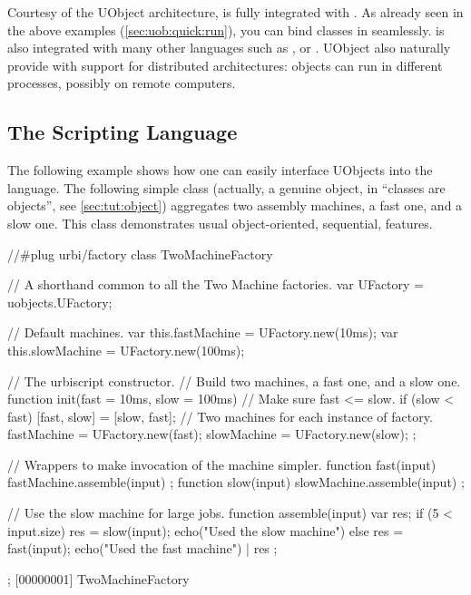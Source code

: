 Courtesy of the UObject architecture, \us is fully integrated with
\Cxx. As already seen in the above examples
(\autoref{sec:uob:quick:run}), you can bind \Cxx classes in \us
seamlessly. \us is also integrated with many other languages such as
\java, \matlab or \python.  UObject also naturally provide \us with
support for distributed architectures: objects can run in different
processes, possibly on remote computers.

\subsection{The \us Scripting Language}

The following example shows how one can easily interface UObjects into
the \us language.  The following simple class (actually, a genuine
object, in \us ``classes are objects'', see \autoref{sec:tut:object})
aggregates two assembly machines, a fast one, and a slow one.  This
class demonstrates usual object-oriented, sequential, features.

\begin{urbiscript}[firstnumber=1]
//#plug urbi/factory
class TwoMachineFactory
{
  // A shorthand common to all the Two Machine factories.
  var UFactory = uobjects.UFactory;

  // Default machines.
  var this.fastMachine = UFactory.new(10ms);
  var this.slowMachine = UFactory.new(100ms);

  // The urbiscript constructor.
  // Build two machines, a fast one, and a slow one.
  function init(fast = 10ms, slow = 100ms)
  {
    // Make sure fast <= slow.
    if (slow < fast)
      [fast, slow] = [slow, fast];
    // Two machines for each instance of factory.
    fastMachine = UFactory.new(fast);
    slowMachine = UFactory.new(slow);
  };

  // Wrappers to make invocation of the machine simpler.
  function fast(input) { fastMachine.assemble(input) };
  function slow(input) { slowMachine.assemble(input) };

  // Use the slow machine for large jobs.
  function assemble(input)
  {
    var res;
    if (5 < input.size)
      { res = slow(input); echo("Used the slow machine") }
    else
      { res = fast(input); echo("Used the fast machine") } |
    res
  };
};
[00000001] TwoMachineFactory
\end{urbiscript}

